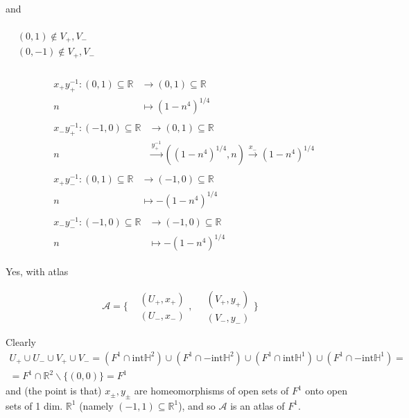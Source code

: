 and 

 $\begin{aligned} & \quad \\ 
  & (0,1) \notin V_+,V_- \\
  & (0,-1) \notin V_+,V_- \\
\end{aligned}$



\solutionhead{}

\[
\begin{aligned}
& 
\begin{aligned}
   x_+y_+^{-1} : (0,1) \subseteq \mathbb{R} & \to (0,1) \subseteq \mathbb{R} \\ 
  n & \mapsto (1-n^4)^{1/4} 
\end{aligned}   \\ 
& 
\begin{aligned}
   x_-y_+^{-1} : (-1,0) \subseteq \mathbb{R} & \to (0,1) \subseteq \mathbb{R} \\ 
  n & \xrightarrow{ y_+^{-1} } ( (1-n^4)^{1/4}, n) \xrightarrow{ x_- } (1-n^4)^{1/4} 
\end{aligned}   \\ 
& \begin{aligned}
   x_+y_-^{-1} : (0,1) \subseteq \mathbb{R} & \to (-1,0) \subseteq \mathbb{R} \\ 
  n & \mapsto -(1-n^4)^{1/4} 
\end{aligned}   \\ 
& \begin{aligned}
   x_-y_-^{-1} : (-1,0) \subseteq \mathbb{R} & \to (-1,0) \subseteq \mathbb{R} \\ 
  n & \mapsto -(1-n^4)^{1/4} 
\end{aligned}   
\end{aligned}
\]


Yes, with atlas

\[
\mathcal{A} = \lbrace \begin{aligned} & (U_+,x_+) \\
  & (U_-,x_-) \end{aligned}, \, \begin{aligned} & (V_+,y_+) \\ & (V_-,y_-) \end{aligned} \rbrace
\]

Clearly 
\[
\begin{gathered}
  U_+ \cup U_- \cup V_+ \cup V_- = (F^1 \cap \text{int}\mathbb{H}^2) \cup (F^1 \cap -\text{int}\mathbb{H}^2)\cup (F^1 \cap \text{int}\mathbb{H}^1) \cup (F^1 \cap -\text{int}\mathbb{H}^1) = \\
= F^1 \cap \mathbb{R}^2\backslash \lbrace (0,0) \rbrace = F^1
\end{gathered}
\]
and (the point is that) $x_{\pm},y_{\pm}$ are homeomorphisms of open sets of $F^1$ onto open sets of 1 dim. $\mathbb{R}^1$ (namely $(-1,1) \subseteq \mathbb{R}^1$), and so $\mathcal{A}$ is an atlas of $F^1$.  
